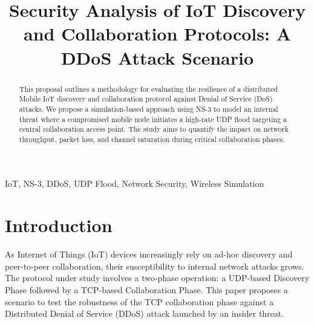 \documentclass[conference]{IEEEtran}
\begin{document}
\title{Security Analysis of IoT Discovery and Collaboration Protocols: A DDoS Attack Scenario}

\author{
}

\maketitle

\begin{abstract}
This proposal outlines a methodology for evaluating the resilience of a distributed Mobile IoT discovery and collaboration protocol against Denial of Service (DoS) attacks. We propose a simulation-based approach using NS-3 to model an internal threat where a compromised mobile node initiates a high-rate UDP flood targeting a central collaboration access point. The study aims to quantify the impact on network throughput, packet loss, and channel saturation during critical collaboration phases.
\end{abstract}

\begin{IEEEkeywords}
IoT, NS-3, DDoS, UDP Flood, Network Security, Wireless Simulation
\end{IEEEkeywords}

\section{Introduction}
As Internet of Things (IoT) devices increasingly rely on ad-hoc discovery and peer-to-peer collaboration, their susceptibility to internal network attacks grows. The protocol under study involves a two-phase operation: a UDP-based Discovery Phase followed by a TCP-based Collaboration Phase. This paper proposes a scenario to test the robustness of the TCP collaboration phase against a Distributed Denial of Service (DDoS) attack launched by an insider threat.
\end{document}
